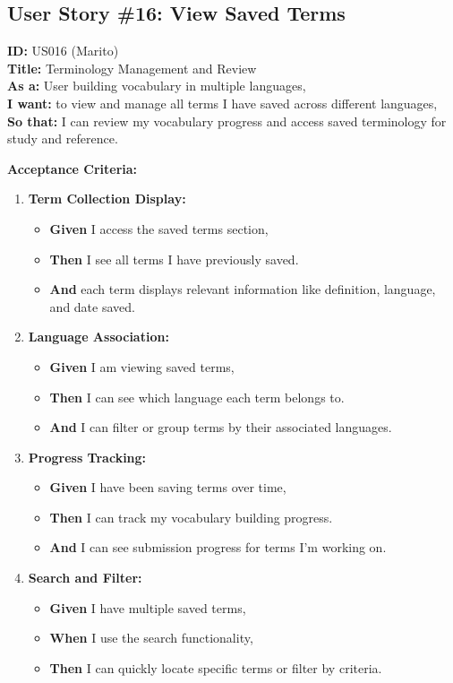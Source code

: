 \documentclass[12pt]{article}
\begin{document}
\subsection{User Story \#16: View Saved Terms}
\textbf{ID:} US016 (Marito) \\
\textbf{Title:} Terminology Management and Review \\
\textbf{As a:} User building vocabulary in multiple languages, \\
\textbf{I want:} to view and manage all terms I have saved across different languages, \\
\textbf{So that:} I can review my vocabulary progress and access saved terminology for study and reference.

\vspace{1em}
\textbf{Acceptance Criteria:}
\begin{enumerate}
    \item \textbf{Term Collection Display:}
    \begin{itemize}
        \item \textbf{Given} I access the saved terms section,
        \item \textbf{Then} I see all terms I have previously saved.
        \item \textbf{And} each term displays relevant information like definition, language, and date saved.
    \end{itemize}

    \item \textbf{Language Association:}
    \begin{itemize}
        \item \textbf{Given} I am viewing saved terms,
        \item \textbf{Then} I can see which language each term belongs to.
        \item \textbf{And} I can filter or group terms by their associated languages.
    \end{itemize}

    \item \textbf{Progress Tracking:}
    \begin{itemize}
        \item \textbf{Given} I have been saving terms over time,
        \item \textbf{Then} I can track my vocabulary building progress.
        \item \textbf{And} I can see submission progress for terms I'm working on.
    \end{itemize}

    \item \textbf{Search and Filter:}
    \begin{itemize}
        \item \textbf{Given} I have multiple saved terms,
        \item \textbf{When} I use the search functionality,
        \item \textbf{Then} I can quickly locate specific terms or filter by criteria.
    \end{itemize}
\end{enumerate}
\end{document}
